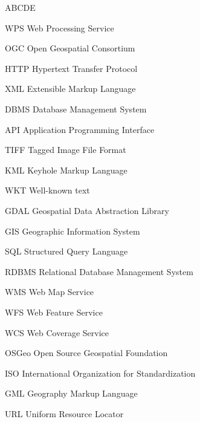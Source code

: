 
\begin{seznamzkratek}{ABCDE}
	      
	     {WPS}
	     {Web Processing Service}	  
	     
	      {OGC}
	      {Open Geospatial Consortium}
	      
	      {HTTP}
	      {Hypertext Transfer Protocol}	         
	      
		  {XML}
	      {Extensible Markup Language}

	      {DBMS}
	      {Database Management System}
	         
	      {API}
	      {Application Programming Interface}
	           
	      {TIFF}
	      {Tagged Image File Format}

	      {KML}
	      {Keyhole Markup Language}
	      
	      {WKT}
	      {Well-known text}	      
	      
	      {GDAL}
	      {Geospatial Data Abstraction Library}
	    
	      {GIS}
	      {Geographic Information System}
	     
	      {SQL}
	      {Structured Query Language}
	            
	      {RDBMS}
	      {Relational Database Management System}	
	      
	      {WMS}
	      {Web Map Service}	
	      
	      {WFS}
	      {Web Feature Service}     
	      
	      {WCS}
	      {Web Coverage Service}
	      	      
	      {OSGeo}
	      {Open Source Geospatial Foundation} 	  
	     	  
	      {ISO}
	      {International Organization for Standardization}
	     	  	  
	      {GML}
	      {Geography Markup Language}
	      	     	  	  
	      {URL}
	      {Uniform Resource Locator}
	     	       
	      	            	      

\end{seznamzkratek}